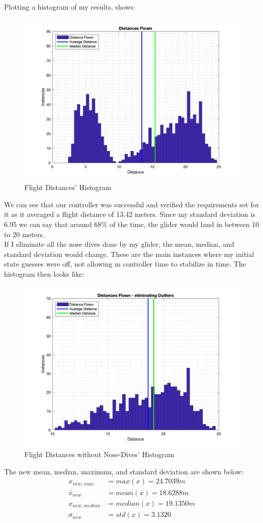 \documentclass[12pt]{article}
\begin{document}
Plotting a histogram of my results, shows:
\begin{figure}[H]
	\centering
	\includegraphics[width=0.6\linewidth]{distances.jpg}
	\caption{Flight Distances' Histogram}
\end{figure}
We can see that our controller was successful and verified the requirements set for it as it averaged a flight distance of 13.42 meters. Since my standard deviation is 6.95 we can say that around 68\% of the time, the glider would land in between 10 to 20 meters.\\
If I eliminate all the nose dives done by my glider, the mean, median, and standard deviation would change. These are the main instances where my initial state guesses were off, not allowing m controller time to stabilize in time. The histogram then looks like:
\begin{figure}[H]
	\centering
	\includegraphics[width=0.6\linewidth]{Distances without outliers.jpg}
	\caption{Flight Distances without Nose-Dives' Histogram}
\end{figure}
The new mean, median, maximum, and standard deviation are shown below:
\begin{align*}
    x_{new,max} &= max(x) = 24.7039 m\\
    \bar{x}_{new} &= mean(x) = 18.6288 m\\
    x_{new,median} &= median(x) = 19.1350 m\\
    \sigma_{new} &= std(x) = 3.1320\\
\end{align*}
\end{document}
